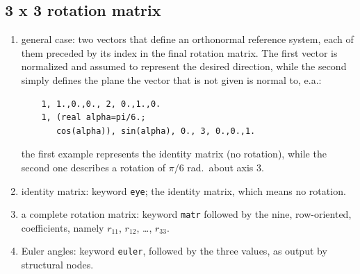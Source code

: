 \documentclass[10pt,dvips]{report}
\begin{document}
\subsection{3 x 3 rotation matrix}
\begin{enumerate}
    \item general case: two vectors that define an orthonormal reference
    system, each of them preceded by its index in the final rotation 
    matrix. The first vector is normalized and assumed to represent the
    desired direction, while the second simply defines the plane the
    vector that is not given is normal to, e.a.:
    \begin{verbatim}
    1, 1.,0.,0., 2, 0.,1.,0.
    1, (real alpha=pi/6.; 
       cos(alpha)), sin(alpha), 0., 3, 0.,0.,1.
    \end{verbatim}
    the first example represents the identity matrix (no rotation),
    while the second one describes a rotation of $ \pi/6 $ rad.\ about
    axis 3.
    \item identity matrix: keyword {\tt eye}; the identity matrix, which means
    no rotation.
    \item a complete rotation matrix: keyword {\tt matr} followed by the
    nine, row-oriented, coefficients, namely $ r_{11} $, $ r_{12} $, \ldots,
    $ r_{33} $.
    \item Euler angles: keyword {\tt euler}, followed by the three
    values, as output by structural nodes.
\end{enumerate}
\end{document}
